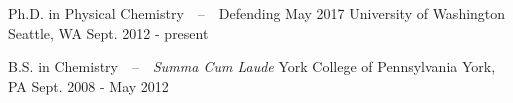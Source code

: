 


\begin{cventries}


\cventry
{Ph.D. in Physical Chemistry~~--~~Defending May 2017} %
{University of Washington} %
{Seattle, WA} %
{Sept. 2012 - present} %
{}



\cventry
{B.S. in Chemistry~~--~~\textit{Summa Cum Laude}} %
{York College of Pennsylvania} %
{York, PA} %
{Sept. 2008 - May 2012} %
{}


\end{cventries}
